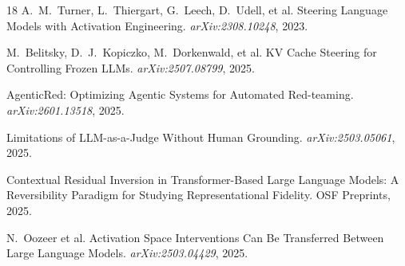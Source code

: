 \documentclass[10pt]{article}
\begin{document}
\begin{thebibliography}{18}
A.~M.~Turner, L.~Thiergart, G.~Leech, D.~Udell, et al.
\newblock Steering Language Models with Activation Engineering.
\newblock \emph{arXiv:2308.10248}, 2023.

M.~Belitsky, D.~J.~Kopiczko, M.~Dorkenwald, et al.
\newblock KV Cache Steering for Controlling Frozen LLMs.
\newblock \emph{arXiv:2507.08799}, 2025.

AgenticRed: Optimizing Agentic Systems for Automated Red-teaming.
\newblock \emph{arXiv:2601.13518}, 2025.

Limitations of LLM-as-a-Judge Without Human Grounding.
\newblock \emph{arXiv:2503.05061}, 2025.

Contextual Residual Inversion in Transformer-Based Large Language Models: A Reversibility Paradigm for Studying Representational Fidelity.
\newblock OSF Preprints, 2025.

N.~Oozeer et al.
\newblock Activation Space Interventions Can Be Transferred Between Large Language Models.
\newblock \emph{arXiv:2503.04429}, 2025.

\end{thebibliography}
\end{document}
